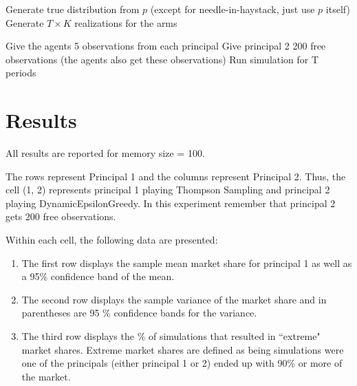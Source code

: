 \documentclass[11pt,letterpaper]{article}
\begin{document}
\begin{algorithm}
\begin{algorithmic}[1]
\State Generate true distribution from $p$ (except for needle-in-haystack, just use $p$ itself)
\State Generate $T \times K$ realizations for the arms 
				
				\State Give the agents 5 observations from each principal
				\State Give principal 2 200 free observations (the agents also get these observations)
				\State Run simulation for T periods
			\EndFor
		\EndFor
	\EndFor
\EndFor
\end{algorithmic}
\end{algorithm}

\section*{Results}
All results are reported for memory size = 100. \\
\vspace{0.25cm}

The rows represent Principal 1 and the columns represent Principal 2. Thus, the cell (1, 2) represents principal 1 playing Thompson Sampling and principal 2 playing DynamicEpsilonGreedy. In this experiment remember that principal 2 gets 200 free observations.  \\
\vspace{0.1cm}

Within each cell, the following data are presented: \\

\begin{enumerate}
\item The first row displays the sample mean market share for principal 1 as well as a 95\% confidence band of the mean.

\item The second row displays the sample variance of the market share and in parentheses are 95 \% confidence bands for the variance.

\item The third row displays the \% of simulations that resulted in ``extreme" market shares. Extreme market shares are defined as being simulations were one of the principals (either principal 1 or 2) ended up with 90\% or more of the market.
\end{enumerate}

\end{document}
